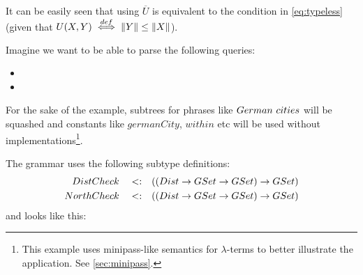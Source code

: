 \documentclass[main.tex]{subfiles}
\begin{document}
It can be easily seen that using 
$\overline{U}$ is equivalent
to the condition in \cref{eq:typeless}
(given that $U(X, Y) \overset{def}{\iff} \|Y\| \leq \|X\|$).
\begin{example}
    Imagine we want to be able to parse the following queries:
    \begin{itemize}
        \item {}
        \item {}
    \end{itemize}

    For the sake of the example, subtrees for phrases like $German \text{ } cities$
    will be squashed and constants like $germanCity$, $within$ etc will be
    used without implementations\footnote{
        This example uses minipass-like semantics for $\lambda$-terms to
        better illustrate the application. See \cref{sec:minipass}.
    }.

    The grammar uses the following subtype definitions:
    \begin{align*}
        DistCheck \quad<:\quad& ((Dist \rightarrow GSet \rightarrow GSet) \rightarrow GSet) \\
        NorthCheck \quad<:\quad& ((Dist \rightarrow GSet \rightarrow GSet) \rightarrow GSet) \\
    \end{align*}
    and looks like this:


\end{example}
\end{document}
